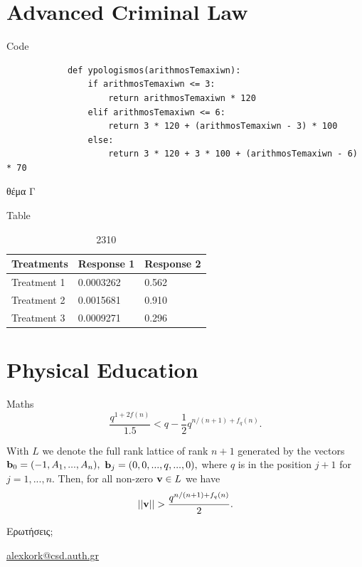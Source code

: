 \documentclass[aspectratio=169]{beamer}
\begin{document}
    \section{Advanced Criminal Law}

    \begin{frame}[fragile]{Code}
        \begin{listing}[H]
            \begin{verbatim}
            def ypologismos(arithmosTemaxiwn):
                if arithmosTemaxiwn <= 3:
                    return arithmosTemaxiwn * 120
                elif arithmosTemaxiwn <= 6:
                    return 3 * 120 + (arithmosTemaxiwn - 3) * 100
                else:
                    return 3 * 120 + 3 * 100 + (arithmosTemaxiwn - 6) * 70
            \end{verbatim}
            \caption{θέμα Γ}
        \end{listing}
    \end{frame}

    \begin{frame}{Table}
        \begin{table}
            \begin{tabular}{|l|l|l|}
                \hline
                \textbf{Treatments} & \textbf{Response 1} & \textbf{Response 2} \\ \hline
                Treatment 1         & 0.0003262           & 0.562               \\
                Treatment 2         & 0.0015681           & 0.910               \\
                Treatment 3         & 0.0009271           & 0.296               \\ \hline
            \end{tabular}
            \caption{2310}
        \end{table}
    \end{frame}

    \section{Physical Education}

    \begin{frame}{Maths}
        \begin{equation}\label{asterisq2}
            \frac{q^{1+2f(n)}}{1.5}<q - \frac{1}{2}q^{n/(n+1)+f_q(n)}.
        \end{equation}
            
        With $L$ we denote the full rank lattice of rank $n+1$ generated by the vectors
        ${\bf b}_0 = (-1,A_1,...,A_{n}),$
        ${\bf b}_j = (0,0,...,q,...,0),$ where $q$ is in the position $j+1$ for $j=1,...,n.$ Then, for all non-zero ${\bf v}\in L$ we have
        $$||{\bf v}||>\frac{q^{n/(n+1)+f_q(n)}}{2}.$$
    \end{frame}

    

    \begin{frame}
        \Huge{\centerline{Ερωτήσεις;}} 
        \normalsize{\centerline{\href{mailto:alexkork@csd.auth.gr}{alexkork@csd.auth.gr}}}
    \end{frame}
    
\end{document}
